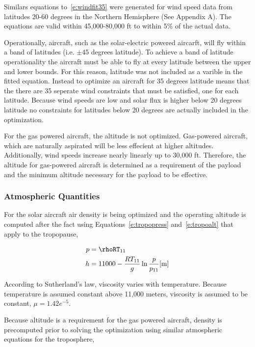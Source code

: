 \documentclass[]{aiaa-tc}%
\begin{document}
Similars equations to~\eqref{e:windfit35} were generated for wind speed data from latitudes 20-60 degrees in the Northern Hemisphere (See Appendix A).  The equations are valid within 45,000-80,000 ft to within 5\% of the actual data. 

Operationally, aircraft, such as the solar-electric powered aircarft, will fly within a band of latitudes (i.e. $\pm$45 degrees latitude).  
To achieve a band of latitude operationality the aircraft must be able to fly at every latitude between the upper and lower bounds.  
For this reason, latitude was not included as a varible in the fitted equation.  
Instead to optimize an aircraft for 35 degrees latitude means that the there are 35 seperate wind constraints that must be satisfied, one for each latitude.
Because wind speeds are low and solar flux is higher below 20 degrees latitude no constraints for latitudes below 20 degrees are actually included in the optimization. 

For the gas powered aircraft, the altitude is not optimized.  
Gas-powered aircraft, which are naturally aspirated will be less effecient at higher altitudes.  
Additionally, wind speeds increase nearly linearly up to 30,000 ft.  
Therefore, the altitude for gas-powered aircraft is determined as a requirement of the payload and the minimum altitude necessary for the payload to be effective. 

\subsubsection{Atmospheric Quantities}

For the solar aircraft air density is being optimized and the operating altitude is computed after the fact using Equations~\ref{e:tropopress} and~\ref{e:tropoalt} \cite{isaatm} that apply to the tropopause, 

\begin{align}
    \label{e:tropopress}
    p &= \rhoRT_{11} \\
    \label{e:tropoalt}
    h &= 11000 - \frac{RT_{11}}{g}\ln{\frac{p}{p_{11}}} \text{[m]} 
\end{align}

According to Sutherland's law\cite{fluiddyhandbook}, viscosity varies with temperature.  Because temperature is assumed constant above 11,000 meters\cite{isaatm}, viscosity is assumed to be constant, $\mu=1.42e^{-5}$.

Because altitude is a requirement for the gas powered aircraft, density is precomputed prior to solving the optimization using similar atmospheric equations for the troposphere,\cite{isaatm} 
\end{document}
